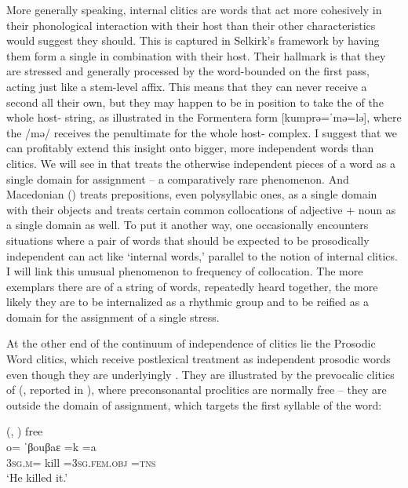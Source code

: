 \documentclass[output=paper,
modfonts
]{LSP/langsci}
\begin{document}
More generally speaking, internal clitics are  words that act more cohesively in their phonological interaction with their host than their other characteristics would suggest they should. This is captured in Selkirk’s framework by having them form a single  in combination with their host. Their hallmark is that they are stressed and generally processed by the word-bounded  on the first pass, acting just like a stem-level affix. This means that they can never receive a second  all their own, but they may happen to be in position to take the  of the whole host- string, as illustrated in the Formentera form  [kumprə=ˈmə=lə], where the  /mə/ receives the penultimate  for the whole host- complex. I suggest that we can profitably extend this insight onto bigger, more independent words than clitics. We will see in  that  treats the otherwise independent pieces of a  word as a single domain for  assignment -- a comparatively rare phenomenon. And Macedonian () treats prepositions, even polysyllabic ones, as a single  domain with their objects and treats certain common collocations of adjective + noun as a single  domain as well. To put it another way, one occasionally encounters situations where a pair of words that should be expected to be prosodically independent can act like ‘internal words,’ parallel to the notion of internal clitics. I will link this unusual phenomenon to frequency of collocation. The more exemplars there are of a string of words, repeatedly heard together, the more likely they are to be internalized as a rhythmic group and to be reified as a domain for the assignment of a single stress.

At the other end of the continuum of independence of clitics lie the Prosodic Word clitics, which receive postlexical treatment as independent prosodic words even though they are underlyingly . They are illustrated by the prevocalic clitics of  (\citealt{obata2003}, reported in \citealt{anderson2011}), where preconsonantal proclitics are normally free  --  they are outside the domain of  assignment, which targets the first syllable of the word: 

\ea \label{ex:kaisse:6}  (\citealt{obata2003}, \citealt[2004]{anderson2011}) free \\
	\gll o=  {\squish ˈβouβaɛ} \squish=k \squish=a\\
	\textsc{3sg.m}= {\squish kill} \squish=\textsc{3sg.fem.obj} \squish\textsc{=tns}\\
	\glt ‘He killed it.’
\z
\end{document}
